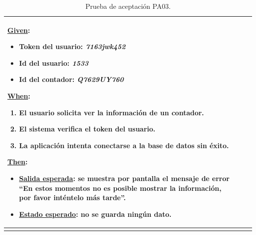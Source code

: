 \documentclass[pdftex,11pt,a4paper]{book}
\begin{document}
\begin{center}
\begin{longtable}{|>{\centering\arraybackslash}X m{2cm}|m{12cm}|}
\underline{Given}:
\vspace{-3mm}
\begin{itemize}
\addtolength{\itemsep}{-3mm}
\item Token del usuario: \textit{7163jwk452}
\item Id del usuario: \textit{1533}
\item Id del contador: \textit{Q7629UY760}
\end{itemize}

\underline{When}:
\begin{enumerate}
\vspace{-3mm}
\addtolength{\itemsep}{-3mm}
\item El usuario solicita ver la información de un contador.
\item El sistema verifica el token del usuario.
\item La aplicación intenta conectarse a la base de datos sin éxito.
\end{enumerate}
\break

\underline{Then}:
\vspace{-3mm}
\begin{itemize}
\addtolength{\itemsep}{-3mm}
\item \underline{Salida esperada}: se muestra por pantalla el mensaje de error “En estos momentos no es posible mostrar la información, por favor inténtelo más tarde”.
\item \underline{Estado esperado}: no se guarda ningún dato.
\end{itemize}
\\ \hline

\caption{Prueba de aceptación PA03.} \label{tablalarga:tablaPA03}
\end{longtable}
\end{center}




\renewcommand{\tablename}{Tabla}
\renewcommand{\arraystretch}{1,7}
\end{document}
